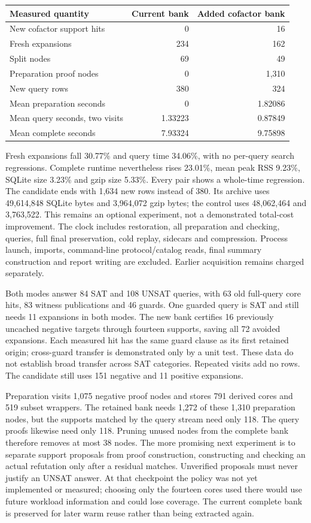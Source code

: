 \documentclass[11pt,a4paper]{article}
\numberwithin{equation}{section}
\theoremstyle{plain}
\theoremstyle{definition}
\theoremstyle{remark}
\begin{document}
\begin{center}
\begin{tabular}{lrr}
\hline
Measured quantity & Current bank & Added cofactor bank \\
\hline
New cofactor support hits & 0 & 16 \\
Fresh expansions & 234 & 162 \\
Split nodes & 69 & 49 \\
Preparation proof nodes & 0 & 1,310 \\
New query rows & 380 & 324 \\
Mean preparation seconds & 0 & 1.82086 \\
Mean query seconds, two visits & 1.33223 & 0.87849 \\
Mean complete seconds & 7.93324 & 9.75898 \\
\hline
\end{tabular}
\end{center}

Fresh expansions fall 30.77\% and query time 34.06\%, with no per-query search
regressions. Complete runtime nevertheless rises 23.01\%, mean peak RSS 9.23\%,
SQLite size 3.23\% and gzip size 5.33\%. Every pair shows a whole-time regression.
The candidate ends with 1,634 new rows instead of 380. Its archive uses
49,614,848 SQLite bytes and 3,964,072 gzip bytes; the control uses 48,062,464 and
3,763,522. This remains an optional experiment, not a demonstrated total-cost
improvement. The clock includes restoration, all preparation and checking,
queries, full final preservation, cold replay, sidecars and compression. Process
launch, imports, command-line protocol/catalog reads, final summary construction
and report writing are excluded. Earlier acquisition remains charged separately.

Both modes answer 84 SAT and 108 UNSAT queries, with 63 old full-query core
hits, 83 witness publications and 46 guards. One guarded query is SAT and still
needs 11 expansions in both modes. The new bank certifies 16 previously
uncached negative targets through fourteen supports, saving all 72 avoided
expansions. Each measured hit has the same guard clause as its first retained
origin; cross-guard transfer is demonstrated only by a unit test. These data
do not establish broad transfer across SAT categories. Repeated visits add no
rows. The candidate still uses 151 negative and 11 positive expansions.

Preparation visits 1,075 negative proof nodes and stores 791 derived cores and
519 subset wrappers. The retained bank needs 1,272 of these 1,310 preparation
nodes, but the supports matched by the query stream need only 118. The query
proofs likewise need only 118. Pruning unused nodes from the complete bank
therefore removes at most 38 nodes. The more promising next experiment is to
separate support proposals from proof construction, constructing and checking
an actual refutation only after a residual matches. Unverified proposals must
never justify an UNSAT answer. At that checkpoint the policy was not yet implemented or
measured; choosing only the fourteen cores used there would use future workload
information and could lose coverage. The current complete bank is preserved
for later warm reuse rather than being extracted again.
\end{document}
